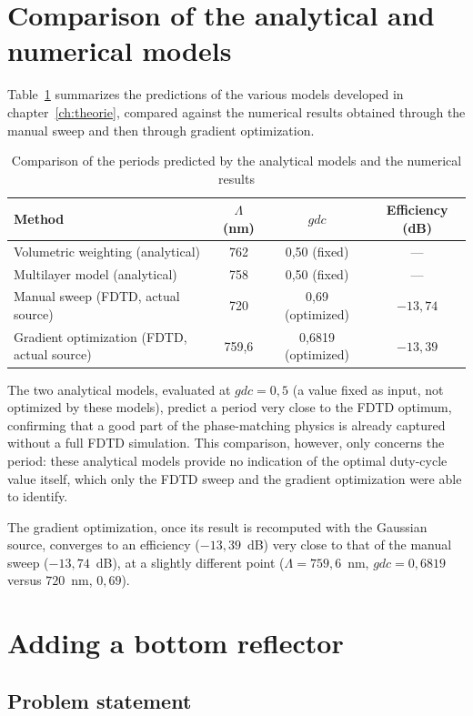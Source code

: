 \documentclass[a4paper,11pt]{report}
\begin{document}
\section{Comparison of the analytical and numerical models}

Table~\ref{tab:comparaison_finale} summarizes the predictions of the various models developed in chapter~\ref{ch:theorie}, compared against the numerical results obtained through the manual sweep and then through gradient optimization.

\begin{table}[h]
\centering
\begin{tabular}{lccc}
\hline
Method & $\Lambda$ (nm) & $gdc$ & Efficiency (dB) \\
\hline
Volumetric weighting (analytical) & 762 & 0,50 (fixed) & --- \\
Multilayer model (analytical) & 758 & 0,50 (fixed) & --- \\
Manual sweep (FDTD, actual source) & 720 & 0,69 (optimized) & $-13,74$ \\
Gradient optimization (FDTD, actual source) & 759,6 & 0,6819 (optimized) & $-13,39$ \\
\hline
\end{tabular}
\caption{Comparison of the periods predicted by the analytical models and the numerical results}
\label{tab:comparaison_finale}
\end{table}

The two analytical models, evaluated at $gdc=0{,}5$ (a value fixed as input, not optimized by these models), predict a period very close to the FDTD optimum, confirming that a good part of the phase-matching physics is already captured without a full FDTD simulation. This comparison, however, only concerns the period: these analytical models provide no indication of the optimal duty-cycle value itself, which only the FDTD sweep and the gradient optimization were able to identify.

The gradient optimization, once its result is recomputed with the Gaussian source, converges to an efficiency ($-13{,}39$~dB) very close to that of the manual sweep ($-13{,}74$~dB), at a slightly different point ($\Lambda=759{,}6$~nm, $gdc=0{,}6819$ versus $720$~nm, $0{,}69$). 

\section{Adding a bottom reflector}

\subsection*{Problem statement}
\end{document}
